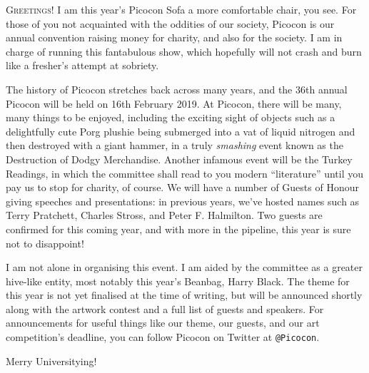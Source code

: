 \lettrine[lines=3]{G}{reetings!} I am this year’s Picocon Sofa \textemdash{} a more comfortable chair, you see. For those of you not acquainted with the oddities of our society, Picocon is our annual convention raising money for charity, and also for the society. I am in charge of running this fantabulous show, which hopefully will not crash and burn like a fresher’s attempt at sobriety.

The history of Picocon stretches back across many years, and the 36th annual Picocon will be held on 16th February 2019. At Picocon, there will be many, many things to be enjoyed, including the exciting sight of objects such as a delightfully cute Porg plushie being submerged into a vat of liquid nitrogen and then destroyed with a giant hammer, in a truly \textit{smashing} event known as the Destruction of Dodgy Merchandise. Another infamous event will be the Turkey Readings, in which the committee shall read to you modern “literature” until you pay us to stop \textemdash{} for charity, of course. We will have a number of Guests of Honour giving speeches and presentations: in previous years, we’ve hosted names such as Terry Pratchett, Charles Stross, and Peter F. Halmilton. Two guests are confirmed for this coming year, and with more in the pipeline, this year is sure not to disappoint!

I am not alone in organising this event. I am aided by the committee as a greater hive-like entity, most notably this year’s Beanbag, Harry Black. The theme for this year is not yet finalised at the time of writing, but will be announced shortly along with the artwork contest and a full list of guests and speakers. For announcements for useful things like our theme, our guests, and our art competition’s deadline, you can follow Picocon on Twitter at \texttt{@Picocon}.

Merry Universitying!
